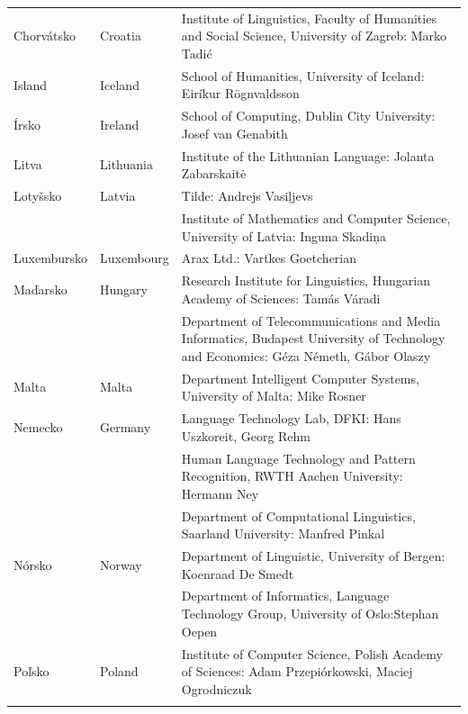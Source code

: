 \begin{longtable}{@{}llp{113mm}@{}}
  Chorvátsko & \textcolor{grey1}{Croatia} & Institute of Linguistics, Faculty of Humanities and Social Science, University of Zagreb: Marko Tadić \\ \addlinespace
  Island & \textcolor{grey1}{Iceland} & School of Humanities, University of Iceland: Eiríkur Rögnvaldsson\\ \addlinespace
  Írsko & \textcolor{grey1}{Ireland} & School of Computing, Dublin City University: Josef van Genabith\\ \addlinespace
  Litva & \textcolor{grey1}{Lithuania} & Institute of the Lithuanian Language: Jolanta Zabarskaitė\\ \addlinespace
  Lotyšsko & \textcolor{grey1}{Latvia} & Tilde: Andrejs Vasiļjevs\\ \addlinespace 
  & & Institute of Mathematics and Computer Science, University of Latvia: Inguna Skadiņa\\ \addlinespace
  Luxembursko & \textcolor{grey1}{Luxembourg} & Arax Ltd.: Vartkes Goetcherian\\ \addlinespace
  Maďarsko & \textcolor{grey1}{Hungary} & Research Institute for Linguistics, Hungarian Academy of Sciences: Tamás Váradi\\  \addlinespace
  & & Department of Telecommunications and Media Informatics, Budapest University of Technology and Economics: Géza Németh, Gábor Olaszy\\ \addlinespace
  Malta & \textcolor{grey1}{Malta} & Department Intelligent Computer Systems, University of Malta: Mike Rosner\\ \addlinespace
  Nemecko & \textcolor{grey1}{Germany} & Language Technology Lab, DFKI: Hans Uszkoreit, Georg Rehm\\ \addlinespace
  & & Human Language Technology and Pattern Recognition, RWTH Aachen University: Hermann Ney \\ \addlinespace
  & & Department of Computational Linguistics, Saarland University: Manfred Pinkal\\ \addlinespace
  Nórsko & \textcolor{grey1}{Norway} & Department of Linguistic, University of Bergen: Koenraad De Smedt\\ \addlinespace 
  & & Department of Informatics, Language Technology Group, University of Oslo:\newline Stephan Oepen \\ \addlinespace
  Poľsko & \textcolor{grey1}{Poland} & Institute of Computer Science, Polish Academy of Sciences: Adam Przepiórkowski, Maciej Ogrodniczuk \\ \addlinespace

\end{longtable}
